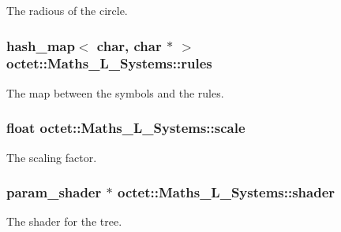The radious of the circle. 

\hypertarget{classoctet_1_1_maths___l___systems_a5c57f1806d42933de86a1d2b2693eb26}{
\subsubsection[{rules}]{\setlength{\rightskip}{0pt plus 5cm}hash\+\_\+map$<$ char, char $\ast$ $>$ octet\+::\+Maths\+\_\+\+L\+\_\+\+Systems\+::rules\hspace{0.3cm}{\ttfamily [private]}}}\label{classoctet_1_1_maths___l___systems_a5c57f1806d42933de86a1d2b2693eb26}


The map between the symbols and the rules. 

\hypertarget{classoctet_1_1_maths___l___systems_a3baf90aa95cd3c535fba893641f0cd1e}{
\subsubsection[{scale}]{\setlength{\rightskip}{0pt plus 5cm}float octet\+::\+Maths\+\_\+\+L\+\_\+\+Systems\+::scale\hspace{0.3cm}{\ttfamily [private]}}}\label{classoctet_1_1_maths___l___systems_a3baf90aa95cd3c535fba893641f0cd1e}


The scaling factor. 

\hypertarget{classoctet_1_1_maths___l___systems_a446a9be9766e7557d06f243a030ab9bf}{
\subsubsection[{shader}]{\setlength{\rightskip}{0pt plus 5cm}param\+\_\+shader $\ast$ octet\+::\+Maths\+\_\+\+L\+\_\+\+Systems\+::shader\hspace{0.3cm}{\ttfamily [private]}}}\label{classoctet_1_1_maths___l___systems_a446a9be9766e7557d06f243a030ab9bf}


The shader for the tree. 

